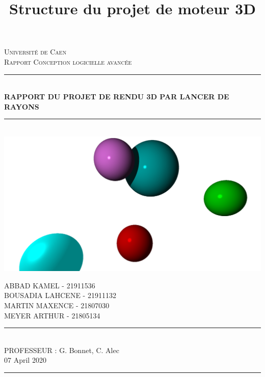 \documentclass[12pt]{article}
\title{Structure du projet de moteur 3D}
\date{}%
\newcommand{\HRule}{\rule{\linewidth}{0.5mm}}
\begin{document}
\begin{titlepage}
  \begin{sffamily}
  \begin{center}
    \textsc{\LARGE Université de Caen}\\[2cm]
    \textsc{\Large Rapport Conception logicielle avancée}\\[1.5cm]
    \HRule \\[0.4cm]
    { \huge \bfseries RAPPORT DU PROJET DE RENDU 3D PAR LANCER DE RAYONS
 \\[0.4cm] }
    \HRule \\[1cm]
    \includegraphics[scale=0.3]{./images/pic1.png}
    \\[1cm]
    \begin{minipage}{0.7\textwidth}
      \begin{flushleft} \large
        ABBAD KAMEL - 21911536 \\
        BOUSADIA LAHCENE - 21911132 \\
        MARTIN MAXENCE - 21807030\\
 		MEYER ARTHUR - 21805134 \\
      \end{flushleft}
    \end{minipage}
    
    \begin{minipage}{0.4\textwidth}
    \end{minipage}
    \vfill
    \HRule \\[0.4cm]
             PROFESSEUR : G. Bonnet, C. Alec \\
             {\large 07 April 2020}
    \HRule \\[0.4cm]
  \end{center}
  \end{sffamily}
\end{titlepage}
    \newpage	
	\begin{center}
		\tableofcontents
	\end{center}
\end{document}
